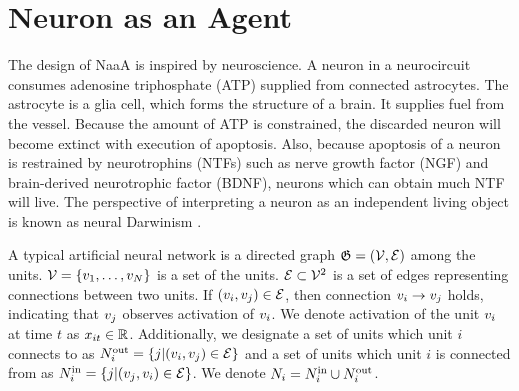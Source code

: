\section{Neuron as an Agent}
The design of NaaA is inspired by neuroscience.
A neuron in a neurocircuit consumes adenosine triphosphate (ATP) supplied from connected astrocytes.
The astrocyte is a glia cell, which forms the structure of a brain. It supplies fuel from the vessel.
Because the amount of ATP is constrained, the discarded neuron will become extinct with execution of apoptosis.
Also, because apoptosis of a neuron is restrained by neurotrophins (NTFs) such as nerve growth factor (NGF) and brain-derived neurotrophic factor (BDNF),
neurons which can obtain much NTF will live.
The perspective of interpreting a neuron as an independent living object is known as neural Darwinism \citep{edelman1987neural}.

A typical artificial neural network is a directed graph $\mathfrak{G} = (\mathcal{V}, \mathcal{E})$ among the units.
$\mathcal{V} = \{v_{1}, \dots, v_{N}\}$ is a set of the units. $\mathcal{E} \subset \mathcal{V}^2$ is a set of edges representing connections between two units.
If $(v_{i}, v_{j}) \in \mathcal{E}$, then connection $v_{i} \rightarrow v_{j}$ holds, indicating that $v_{j}$ observes activation of $v_{i}$.
We denote activation of the unit $v_{i}$ at time $t$ as $x_{it} \in \mathbb{R}$.
Additionally, we designate a set of units which unit $i$ connects to as $N^\mathrm{out}_i = \{j | (v_{i}, v_{j}) \in \mathcal{E} \}$ and a set of units which unit $i$ is connected from as $N^\mathrm{in}_i = \{j | (v_{j}, v_{i}) \in \mathcal{E} \}$.
We denote $N_i = N^\mathrm{in}_i \cup N^\mathrm{out}_i$.

